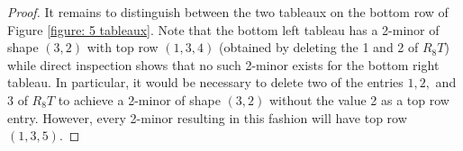 \documentclass[12pt]{amsart}
\theoremstyle{definition}
\theoremstyle{remark}
\numberwithin{equation}{section}
\numberwithin{figure}{section}
\begin{document}
\begin{proof}
 It remains to distinguish between the two tableaux on the bottom row of Figure \ref{figure: 5 tableaux}. Note that the bottom left tableau has a 2-minor of shape $(3,2)$ with top row $(1,3,4)$ (obtained by deleting the 1 and 2 of $R_8T$) while direct inspection shows that no such 2-minor exists for the bottom right tableau. In particular, it would be necessary to delete two of the entries $1,2,$ and $3$ of $R_8T$ to achieve a 2-minor of shape $(3,2)$ without the value 2 as a top row entry. However, every 2-minor resulting in this fashion will have top row $(1,3,5)$.
\end{proof}
\end{document}
